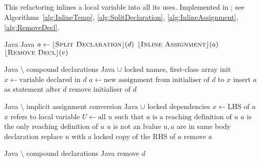 \subsection{}
This refactoring inlines a local variable into all its uses. Implemented in ; see Algorithms~\ref{alg:InlineTemp}, \ref{alg:SplitDeclaration}, \ref{alg:InlineAssignment}, \ref{alg:RemoveDecl}.

\begin{algorithm}[p]
\caption{$\refactoring{Inline Temp}(d : \type{LocalVar})$}
\label{alg:InlineTemp}
\begin{algorithmic}[1]
\REQUIRE Java
\ENSURE Java
\medskip
\STATE $a \leftarrow \lfloor\textsc{Split Declaration}\rfloor(d)$
\STATE $\lfloor\textsc{Inline Assignment}\rfloor(a)$
\STATE $\lfloor\textsc{Remove Decl}\rfloor(v)$
\end{algorithmic}
\end{algorithm}

\begin{algorithm}[p]
\caption{$\refactoring{Split Declaration}(d : \type{LocalVar}) : \option{\type{Assignment}}$}
\label{alg:SplitDeclaration}
\begin{algorithmic}[1]
\REQUIRE Java $\setminus$ compound declarations
\ENSURE Java $\cup$ locked names, first-class array init
\medskip
{}
  \STATE $x \leftarrow \text{variable declared in $d$}$
  \STATE $a \leftarrow \text{new assignment from initialiser of $d$ to $x$}$
  \STATE insert $a$ as statement after $d$
  \STATE remove initialiser of $d$
  \RETURN {}
\ELSE
  \RETURN \None
\ENDIF
\end{algorithmic}
\end{algorithm}

\begin{algorithm}[p]
\caption{$\refactoring{Inline Assignment}(a : \type{Assignment})$}
\label{alg:InlineAssignment}
\begin{algorithmic}[1]
\REQUIRE Java $\setminus$ implicit assignment conversion
\ENSURE Java $\cup$ locked dependencies
\medskip
\STATE $x \leftarrow \text{LHS of $a$}$
\STATE \assert $x$ refers to local variable
\STATE $U \leftarrow \text{all $u$ such that $a$ is a reaching definition of $u$}$
  \STATE \assert $a$ is the only reaching definition of $u$
  \STATE \assert $u$ is not an lvalue
  \STATE \assert $u,a$ are in same body declaration
  \STATE replace $u$ with a locked copy of the RHS of $a$
\ENDFOR
{}
  \STATE remove $a$
\ENDIF
\end{algorithmic}
\end{algorithm}

\begin{algorithm}[p]
\caption{$\refactoring{Remove Decl}(d : \type{LocalVar})$}
\label{alg:RemoveDecl}
\begin{algorithmic}[1]
\REQUIRE Java $\setminus$ compound declarations
\ENSURE Java
\medskip
{}
  \STATE remove $d$
\ENDIF
\end{algorithmic}
\end{algorithm}
